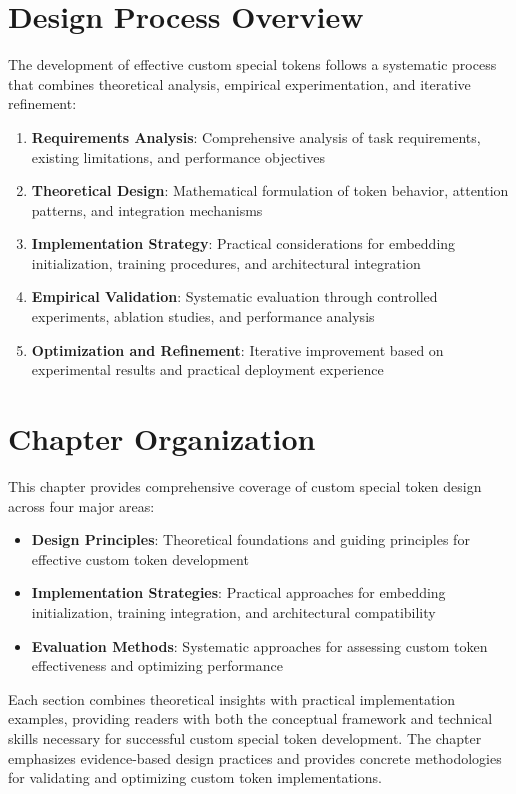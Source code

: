 \section{Design Process Overview}

The development of effective custom special tokens follows a systematic process that combines theoretical analysis, empirical experimentation, and iterative refinement:

\begin{enumerate}
\item \textbf{Requirements Analysis}: Comprehensive analysis of task requirements, existing limitations, and performance objectives
\item \textbf{Theoretical Design}: Mathematical formulation of token behavior, attention patterns, and integration mechanisms
\item \textbf{Implementation Strategy}: Practical considerations for embedding initialization, training procedures, and architectural integration
\item \textbf{Empirical Validation}: Systematic evaluation through controlled experiments, ablation studies, and performance analysis
\item \textbf{Optimization and Refinement}: Iterative improvement based on experimental results and practical deployment experience
\end{enumerate}

\section{Chapter Organization}

This chapter provides comprehensive coverage of custom special token design across four major areas:

\begin{itemize}
\item \textbf{Design Principles}: Theoretical foundations and guiding principles for effective custom token development
\item \textbf{Implementation Strategies}: Practical approaches for embedding initialization, training integration, and architectural compatibility
\item \textbf{Evaluation Methods}: Systematic approaches for assessing custom token effectiveness and optimizing performance
\end{itemize}

Each section combines theoretical insights with practical implementation examples, providing readers with both the conceptual framework and technical skills necessary for successful custom special token development. The chapter emphasizes evidence-based design practices and provides concrete methodologies for validating and optimizing custom token implementations.